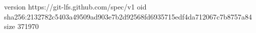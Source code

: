 version https://git-lfs.github.com/spec/v1
oid sha256:2132782c5403a49509ad903e7b2d92568fd6935715edf4da712067c7b8757a84
size 371970
